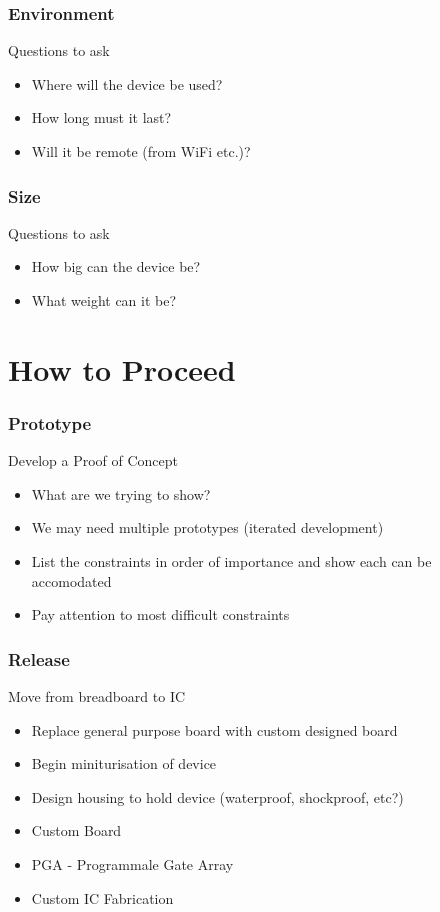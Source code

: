 \documentclass{beamer}
\begin{document}
\begin{frame}
	\frametitle{Environment}
	Questions to ask
	\begin{itemize}
		
		\item Where will the device be used?
		\item How long must it last?
		\item Will it be remote (from WiFi etc.)?
		
	\end{itemize}
	
\end{frame}

\begin{frame}
	\frametitle{Size}
	Questions to ask
	\begin{itemize}
		
		\item How big can the device be?
		\item What weight can it be?
		
	\end{itemize}
	
\end{frame}
 \section{How to Proceed}
 
 \begin{frame}
 	\frametitle{Prototype}
 	Develop a Proof of Concept
 	\begin{itemize}
 		
 		\item What are we trying to show?
 		\item We may need multiple prototypes (iterated development)
 		\item List the constraints in order of importance and show each can be accomodated
 		\item Pay attention to most difficult constraints
 		
 	\end{itemize}
 	
 \end{frame}
 
  \begin{frame}
  	\frametitle{Release}
  	Move from breadboard to IC
  	\begin{itemize}
  		
  		\item Replace general purpose board with custom designed board
  		\item Begin miniturisation of device
  		\item Design housing to hold device (waterproof, shockproof, etc?)
  		\item Custom Board
  		\item PGA - Programmale Gate Array
  		\item Custom IC Fabrication
  		
  	\end{itemize}
  	
  \end{frame}  
\end{document}
